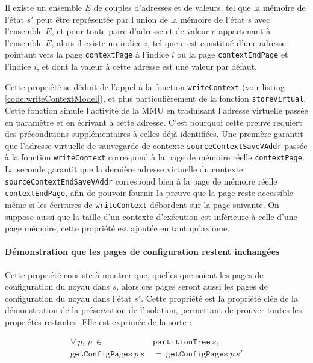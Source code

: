 			\begin{property}
				Il existe un ensemble $E$ de couples d'adresses et de valeurs, tel que la mémoire de l'état $s'$ peut être représentée par l'union de la mémoire de l'état $s$ avec l'ensemble $E$, et pour toute paire d'adresse et de valeur $e$ appartenant à l'ensemble $E$, alors il existe un indice $i$, tel que $e$ est constitué d'une adresse pointant vers la page \texttt{contextPage} à l'indice $i$ ou la page \texttt{contextEndPage} et l'indice $i$, et dont la valeur à cette adresse est une valeur par défaut.
			\label{prop:s'redef}
			\end{property}

			Cette propriété se déduit de l'appel à la fonction \texttt{writeContext} (voir listing \ref{code:writeContextModel}), et plus particulièrement de la fonction \texttt{storeVirtual}. Cette fonction simule l'activité de la MMU en traduisant l'adresse virtuelle passée en paramètre et en écrivant à cette adresse. C'est pourquoi cette preuve requiert des préconditions supplémentaires à celles déjà identifiées. Une première garantit que l'adresse virtuelle de sauvegarde de contexte \texttt{sourceContextSaveVAddr} passée à la fonction \texttt{writeContext} correspond à la page de mémoire réelle \texttt{contextPage}. La seconde garantit que la dernière adresse virtuelle du contexte \texttt{sourceContextEndSaveVAddr} correspond bien à la page de mémoire réelle \texttt{contextEndPage}, afin de pouvoir fournir la preuve que la page reste accessible même si les écritures de \texttt{writeContext} débordent sur la page suivante. On suppose aussi que la taille d'un contexte d'exécution est inférieure à celle d'une page mémoire, cette propriété est ajoutée en tant qu'axiome.

			\paragraph{Démonstration que les pages de configuration restent inchangées}

			Cette propriété consiste à montrer que, quelles que soient les pages de configuration du noyau dans $s$, alors ces pages seront aussi les pages de configuration du noyau dans l'état $s'$. Cette propriété est la propriété clée de la démonstration de la préservation de l'isolation, permettant de prouver toutes les propriétés restantes. Elle est exprimée de la sorte :

			\begin{align*}
				\forall~p,~p~\in~&\mathtt{partitionTree}~s,\\
				\mathtt{getConfigPages}~p~s~&=~\mathtt{getConfigPages}~p~s'
			\end{align*}

